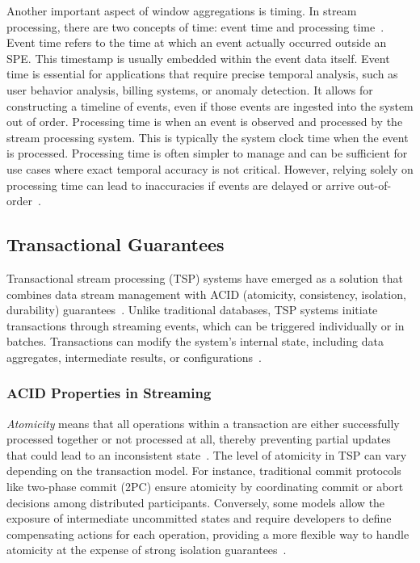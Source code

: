 Another important aspect of window aggregations is timing. In stream processing, there are two concepts of time: event time and processing time~\cite{Akidau:2015:DMP:2824032.2824076, carbone2015apache}. Event time refers to the time at which an event actually occurred outside an SPE. This timestamp is usually embedded within the event data itself. Event time is essential for applications that require precise temporal analysis, such as user behavior analysis, billing systems, or anomaly detection. It allows for constructing a timeline of events, even if those events are ingested into the system out of order. Processing time is when an event is observed and processed by the stream processing system. This is typically the system clock time when the event is processed. Processing time is often simpler to manage and can be sufficient for use cases where exact temporal accuracy is not critical. However, relying solely on processing time can lead to inaccuracies if events are delayed or arrive out-of-order~\cite{Akidau:2015:DMP:2824032.2824076, carbone2015apache}.

\subsection{Transactional Guarantees}
\label{transactional}

Transactional stream processing (TSP) systems have emerged as a solution that combines data stream management with ACID (atomicity, consistency, isolation, durability) guarantees~\cite{zhang2024survey, affetti2020tspoon, botan2012transactional}. Unlike traditional databases, TSP systems initiate transactions through streaming events, which can be triggered individually or in batches. Transactions can modify the system's internal state, including data aggregates, intermediate results, or configurations~\cite{zhang2024survey}.

\subsubsection{ACID Properties in Streaming}

{\em Atomicity} means that all operations within a transaction are either successfully processed together or not processed at all, thereby preventing partial updates that could lead to an inconsistent state~\cite{zhang2024survey}. The level of atomicity in TSP can vary depending on the transaction model. For instance, traditional commit protocols like two-phase commit (2PC) ensure atomicity by coordinating commit or abort decisions among distributed participants. Conversely, some models allow the exposure of intermediate uncommitted states and require developers to define compensating actions for each operation, providing a more flexible way to handle atomicity at the expense of strong isolation guarantees~\cite{10.1145/38713.38742}.

